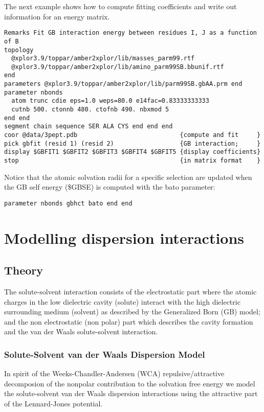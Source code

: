 \documentclass[12pt]{report}
\begin{document}
The next example shows how to compute fitting coefficients and write out information for an energy matrix.
\begin{verbatim}
Remarks Fit GB interaction energy between residues I, J as a function of B
topology
  @xplor3.9/toppar/amber2xplor/lib/masses_parm99.rtf
  @xplor3.9/toppar/amber2xplor/lib/amino_parm99SB.bbunif.rtf
end
parameters @xplor3.9/toppar/amber2xplor/lib/parm99SB.gbAA.prm end
parameter nbonds
  atom trunc cdie eps=1.0 weps=80.0 e14fac=0.83333333333
  cutnb 500. ctonnb 480. ctofnb 490. nbxmod 5
end end
segment chain sequence SER ALA CYS end end end
coor @data/3pept.pdb                            {compute and fit     }                                             
pick gbfit (resid 1) (resid 2)                  {GB interaction;     }
display $GBFIT1 $GBFIT2 $GBFIT3 $GBFIT4 $GBFIT5 {display coefficients}
stop                                            {in matrix format    }
\end{verbatim}

Notice that the atomic solvation radii for a specific selection are updated when the GB self energy (\$GBSE) is computed
with the bato parameter:
\begin{verbatim}
parameter nbonds gbhct bato end end
\end{verbatim}

\chapter{Modelling dispersion interactions}

\section{Theory}
The solute-solvent interaction consists of the electrostatic part where the atomic charges in the low dielectric cavity (solute) 
interact with the high dielectric surrounding medium (solvent) as described by the Generalized Born (GB) model; and the 
non electrostatic (non polar) part which describes the cavity formation and the van der Waals solute-solvent interaction.
        
\subsection{Solute-Solvent van der Waals Dispersion Model}
In spirit of the Weeks-Chandler-Andersen (WCA) repulsive/attractive decomposion of the nonpolar contribution to the solvation
free energy \cite{Weeks71} we model the solute-solvent van der Waals dispersion interactions using the attractive part of the
Lennard-Jones potential. 
\end{document}
